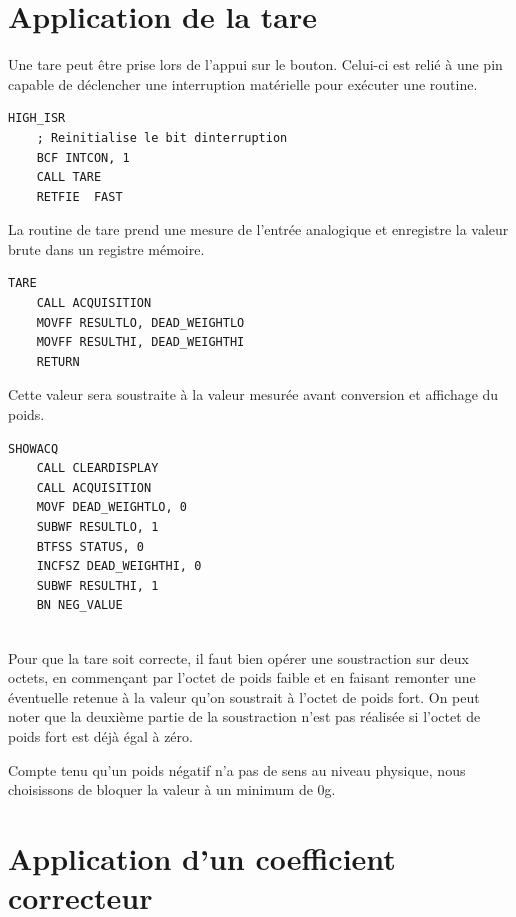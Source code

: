 \documentclass[a4paper,11pt,titlepage]{article}
\begin{document}
\section{Application de la tare}

Une tare peut être prise lors de l'appui sur le bouton. Celui-ci est relié à une pin capable de déclencher une interruption matérielle pour exécuter une routine.\\

\begin{lstlisting}
HIGH_ISR
    ; Reinitialise le bit dinterruption
    BCF INTCON, 1
    CALL TARE
    RETFIE  FAST
\end{lstlisting}

La routine de tare prend une mesure de l'entrée analogique et enregistre la valeur brute dans un registre mémoire.\\

\begin{lstlisting}
TARE
    CALL ACQUISITION
    MOVFF RESULTLO, DEAD_WEIGHTLO
    MOVFF RESULTHI, DEAD_WEIGHTHI
    RETURN
\end{lstlisting}

Cette valeur sera soustraite à la valeur mesurée avant conversion et affichage du poids.\\

\begin{lstlisting}
SHOWACQ
    CALL CLEARDISPLAY
    CALL ACQUISITION      
    MOVF DEAD_WEIGHTLO, 0		   
    SUBWF RESULTLO, 1
    BTFSS STATUS, 0		          
    INCFSZ DEAD_WEIGHTHI, 0	   
    SUBWF RESULTHI, 1		        
    BN NEG_VALUE		    
    
\end{lstlisting}

Pour que la tare soit correcte, il faut bien opérer une soustraction sur deux octets, en commençant par l'octet de poids faible et en faisant remonter une éventuelle retenue à la valeur qu'on soustrait à l'octet de poids fort. 
On peut noter que la deuxième partie de la soustraction n'est pas réalisée si l'octet de poids fort est déjà égal à zéro.

Compte tenu qu'un poids négatif n'a pas de sens au niveau physique, nous choisissons de bloquer la valeur à un minimum de 0g.


\section{Application d'un coefficient correcteur}
\end{document}
